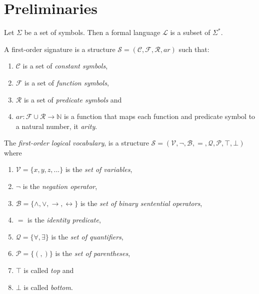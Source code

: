 \chapter{Preliminaries}

\begin{definition}
    Let $\Sigma$ be a set of symbols. Then a formal language $\mathcal{L}$ is a subset of $\Sigma^*$.
\end{definition}

\begin{definition}
    A first-order signature is a structure $\mathcal{S} = (\mathcal{C},\mathcal{F},\mathcal{R},ar)$ such that:
    \begin{enumerate}
        \item $\mathcal{C}$ is a set of \textit{constant symbols},
        \item $\mathcal{F}$ is a set of \textit{function symbols},
        \item $\mathcal{R}$ is a set of \textit{predicate symbols} and
        \item $ar : \mathcal{F} \cup \mathcal{R} \to \mathbb{N}$ is a function that maps each function and predicate symbol to a natural number, it \textit{arity}.
    \end{enumerate}
\end{definition}

\begin{definition}
    The \textit{first-order logical vocabulary}, is a structure $\mathcal{S} = (\mathcal{V},\neg,\mathcal{B},=,\mathcal{Q},\mathcal{P}, \top, \bot)$ where
    \begin{enumerate}
        \item $\mathcal{V} = \{x,y,z,...\}$ is the \textit{set of variables},
        \item $\neg$ is the \textit{negation operator},
        \item $\mathcal{B} = \{\land,\lor,\to,\leftrightarrow\}$ is the \textit{set of binary sentential operators},
        \item $=$ is the \textit{identity predicate},
        \item $\mathcal{Q} = \{\forall, \exists\}$ is the \textit{set of quantifiers},
        \item $\mathcal{P} = \{(,)\}$ is the \textit{set of parentheses},
        \item $\top$ is called \textit{top} and
        \item $\bot$ is called \textit{bottom}.
    \end{enumerate}
\end{definition}

